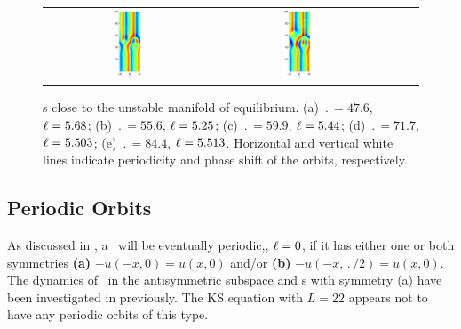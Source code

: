 \begin{figure}[t]
\begin{center}
\begin{tabular}{ccccc}
\includegraphics[width=0.18\textwidth]{figs/ks22rpo071.7-05.50.eps}\hspace{-3ex} &
\includegraphics[width=0.18\textwidth]{figs/ks22rpo084.4-05.51.eps}
\end{tabular}
\end{center}
\caption{\Rpo s close to the unstable manifold of  equilibrium.
(a) $\period{} = 47.6$, $\ell = 5.68$;
(b) $\period{} = 55.6$, $\ell = 5.25$;
(c) $\period{} = 59.9$, $\ell = 5.44$;
(d) $\period{} = 71.7$, $\ell = 5.503$;
(e) $\period{} = 84.4$, $\ell = 5.513$.
Horizontal and vertical white lines indicate periodicity and
phase shift of the orbits, respectively. }\label{f:ks22rposCage}
\end{figure}


\subsection{Periodic Orbits} \label{ssec:po}
As discussed in , a \rpo\ will be eventually
periodic,\ie, $\ell = 0$, if it has either one or both symmetries
{\bf (a)} $-u(-x,0) = u(x,0)$ and/or {\bf (b)} $-u(-x,\period{}/2) =
u(x,0)$. The dynamics of \KSe\ in the antisymmetric subspace and \po
s with symmetry (a) have been investigated in
previously. The KS equation
with $L = 22$ appears not to have any periodic orbits of this type.

